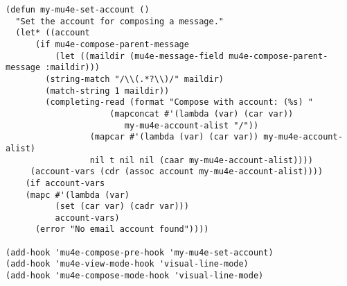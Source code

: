\documentclass[11pt]{article}
\begin{document}
\begin{verbatim}
(defun my-mu4e-set-account ()
  "Set the account for composing a message."
  (let* ((account
	  (if mu4e-compose-parent-message
	      (let ((maildir (mu4e-message-field mu4e-compose-parent-message :maildir)))
		(string-match "/\\(.*?\\)/" maildir)
		(match-string 1 maildir))
	    (completing-read (format "Compose with account: (%s) "
				     (mapconcat #'(lambda (var) (car var))
						my-mu4e-account-alist "/"))
			     (mapcar #'(lambda (var) (car var)) my-mu4e-account-alist)
			     nil t nil nil (caar my-mu4e-account-alist))))
	 (account-vars (cdr (assoc account my-mu4e-account-alist))))
    (if account-vars
	(mapc #'(lambda (var)
		  (set (car var) (cadr var)))
	      account-vars)
      (error "No email account found"))))

(add-hook 'mu4e-compose-pre-hook 'my-mu4e-set-account)
(add-hook 'mu4e-view-mode-hook 'visual-line-mode)
(add-hook 'mu4e-compose-mode-hook 'visual-line-mode)
\end{verbatim}
\end{document}
